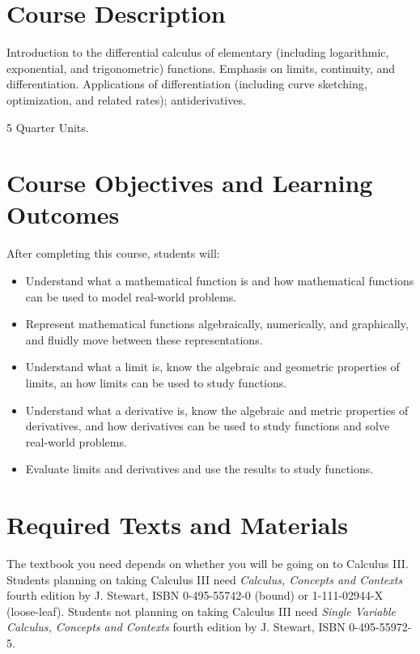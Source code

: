 \documentclass[10pt, letterpaper]{letter}
\begin{document}
\makesyllabushead

\section{Course Description}

Introduction to the differential calculus of elementary
(including logarithmic, exponential, and trigonometric)
functions. Emphasis on limits, continuity, and differentiation.
Applications of differentiation (including curve sketching,
optimization, and related rates); antiderivatives.

5 Quarter Units.

\section{Course Objectives and Learning Outcomes}

After completing this course, students will:
\begin{itemize}
    \item Understand what a mathematical function is and how
        mathematical functions can be used to model real-world problems.
    \item Represent mathematical functions algebraically, numerically,
        and graphically, and fluidly move between these representations.
    \item Understand what a limit is, know the algebraic and geometric
        properties of limits, an how limits can be used to study
        functions.
    \item Understand what a derivative is, know the algebraic and
        metric properties of derivatives, and how derivatives can be
        used to study functions and solve real-world problems.
    \item Evaluate limits and derivatives and use the results to study
        functions.
\end{itemize}

\section{Required Texts and Materials}

The textbook you need depends on whether you will be going on to
Calculus III. Students planning on taking Calculus III need
\emph{Calculus, Concepts and Contexts} fourth edition by J. Stewart,
ISBN 0-495-55742-0 (bound) or 1-111-02944-X (loose-leaf). Students not
planning on taking Calculus III need \emph{Single Variable Calculus,
Concepts and Contexts} fourth edition by J. Stewart,
ISBN 0-495-55972-5.
\end{document}
